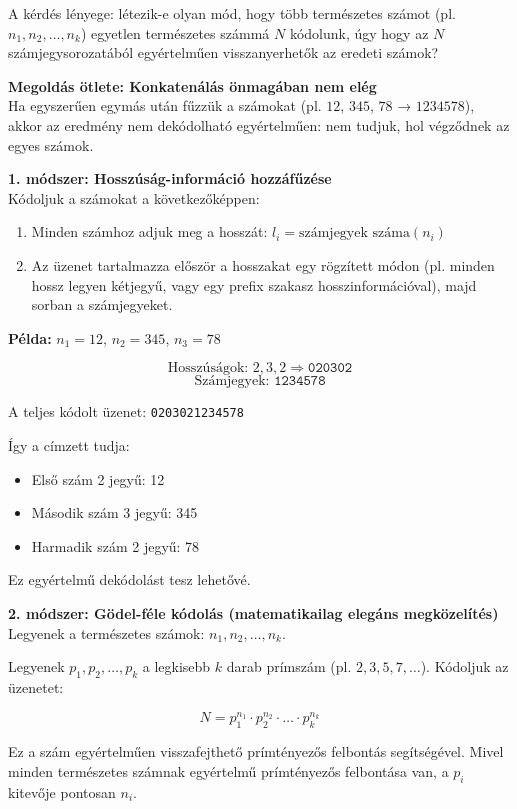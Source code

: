 \begin{solution}
A kérdés lényege: létezik-e olyan mód, hogy több természetes számot
(pl. $n_{1},n_{2},\dots,n_{k}$) egyetlen természetes számmá $N$
kódolunk, úgy hogy az $N$ számjegysorozatából egyértelműen visszanyerhetők
az eredeti számok?


\textbf{Megoldás ötlete: Konkatenálás önmagában nem elég}\\

Ha egyszerűen egymás után fűzzük a számokat (pl. $12$, $345$, $78$
→ $1234578$), akkor az eredmény nem dekódolható egyértelműen: nem
tudjuk, hol végződnek az egyes számok.

\textbf{1. módszer: Hosszúság-információ hozzáfűzése}\\

Kódoljuk a számokat a következőképpen:
\begin{enumerate}
\item Minden számhoz adjuk meg a hosszát: $l_{i}=\text{számjegyek száma}(n_{i})$ 
\item Az üzenet tartalmazza először a hosszakat egy rögzített módon (pl.
minden hossz legyen kétjegyű, vagy egy prefix szakasz hosszinformációval),
majd sorban a számjegyeket. 
\end{enumerate}
\textbf{Példa:} $n_{1}=12$, $n_{2}=345$, $n_{3}=78$

\[
\text{Hosszúságok: }2,3,2\Rightarrow\texttt{020302}
\]
\[
\text{Számjegyek: }\texttt{1234578}
\]

A teljes kódolt üzenet: \texttt{0203021234578}

Így a címzett tudja: 
\begin{itemize}
\item Első szám 2 jegyű: 12 
\item Második szám 3 jegyű: 345 
\item Harmadik szám 2 jegyű: 78 
\end{itemize}
Ez egyértelmű dekódolást tesz lehetővé.

\textbf{2. módszer: Gödel-féle kódolás (matematikailag elegáns megközelítés)}\\

Legyenek a természetes számok: $n_{1},n_{2},\dots,n_{k}$.

Legyenek $p_{1},p_{2},\dots,p_{k}$ a legkisebb $k$ darab prímszám
(pl. $2,3,5,7,\dots$). Kódoljuk az üzenetet:

\[
N=p_{1}^{n_{1}}\cdot p_{2}^{n_{2}}\cdot\dots\cdot p_{k}^{n_{k}}
\]

Ez a szám egyértelműen visszafejthető prímtényezős felbontás segítségével.
Mivel minden természetes számnak egyértelmű prímtényezős felbontása
van, a $p_{i}$ kitevője pontosan $n_{i}$.


\end{solution}
